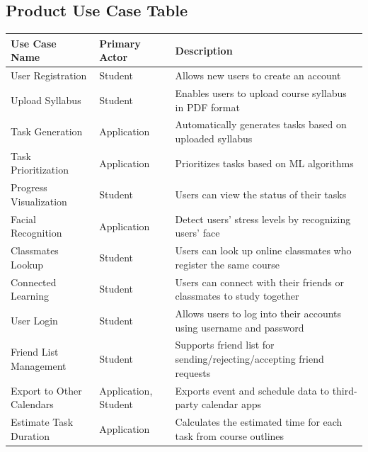 \documentclass[12pt]{article}
\begin{document}
\subsection{Product Use Case Table}
\begin{longtable}{ |p{3cm}|p{5cm}|p{5cm}|}
    \hline
    Use Case Name & Primary Actor & Description \\
    \hline
    User Registration & Student & Allows new users to create an account \\
    \hline
    Upload Syllabus & Student & Enables users to upload course syllabus in PDF format \\
    \hline
    Task Generation & Application & Automatically generates tasks based on uploaded syllabus \\
    \hline
    Task Prioritization & Application & Prioritizes tasks based on ML algorithms \\
    \hline
    Progress Visualization & Student & Users can view the status of their tasks \\
    \hline
    Facial Recognition & Application & Detect users' stress levels by recognizing users' face \\
    \hline
    Classmates Lookup & Student & Users can look up online classmates who register the same course \\
    \hline
    Connected Learning & Student & Users can connect with their friends or classmates to study together \\
    \hline
    User Login & Student & Allows users to log into their accounts using username and password \\
    \hline
    Friend List Management & Student & Supports friend list for sending/rejecting/accepting friend requests \\
    \hline
    Export to Other Calendars & Application, Student & Exports event and schedule data to third-party calendar apps \\
    \hline
    Estimate Task Duration & Application & Calculates the estimated time for each task from course outlines \\
    \hline
\end{longtable}
\end{document}
